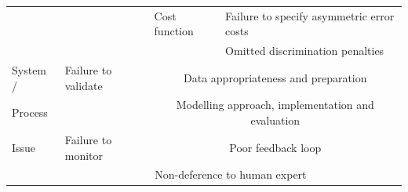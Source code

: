 \begin{table}[h!]
\begin{tabular}{|l|l|l|l|}
\cline{3-4}
          &                     & Cost function   & Failure to specify asymmetric error costs                 \\
\cline{4-4}
          &                     &                 & Omitted discrimination penalties                          \\
\hline
\hline
System /  & Failure to validate & \multicolumn{2}{c|}{Data appropriateness and preparation}                   \\
\cline{3-4}
Process   &                     & \multicolumn{2}{c|}{Modelling approach, implementation and evaluation}      \\
\cline{2-4}
Issue     & Failure to monitor  & \multicolumn{2}{c|}{Poor feedback loop}                                     \\
\cline{2-4}
          & \multicolumn{3}{c|}{Non-deference to human expert}                                                \\
\hline
\end{tabular}
\end{table}

